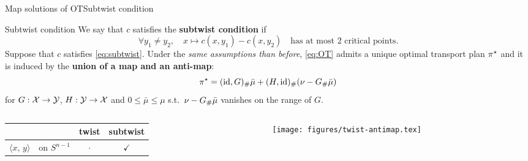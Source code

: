 \documentclass[9pt,xcolor={dvipsnames}]{beamer}
\begin{document}
\begin{frame}{Map solutions of OT}{Subtwist condition}
    \begin{block}{Subtwist condition }
        We say that $c$ satisfies the \textbf{subtwist condition} if
    \begin{equation}
        \tag{Subtwist}
        \forall y_1\neq y_2,\quad x\mapsto c(x,y_1)-c(x,y_2)\quad \text{has at most 2 critical points.}
        \label{eq:subtwist}
    \end{equation}
    Suppose that $c$ satisfies \cref{eq:subtwist}. Under the \emph{same assumptions than before}, \cref{eq:OT} admits a unique optimal transport plan $\pi^\star$ and it is induced by the \textbf{union of a map and an anti-map}:
    \begin{equation*}
        \pi^\star=(\operatorname{id} , G)_\# \bar\mu+(H, \operatorname{id})_\#(\nu-G_\# \bar\mu)
    \end{equation*}
    for $G:\mathcal{X}\to\mathcal{Y}$, $H: \mathcal{Y}\to\mathcal{X}$ and $0\leq\bar\mu \leq \mu$ s.t.~$\nu-G_\# \bar\mu$ vanishes on the range of $G$.
    \end{block}
    \begin{columns}
        \begin{column}{.7\textwidth}
                \begin{table}[h]
                    \raggedright
                    \begin{tabular}{ll|cc}
                                           &                &  twist        & subtwist  \\\hline
                    $\langle x,\,y\rangle$ & on $ S^{n-1}$ &  $\cdot$      & $\checkmark$
                    \end{tabular}
                \end{table}
        \end{column}
        \begin{column}{.3\textwidth}
            \begin{figure}
                \texttt{[image: figures/twist-antimap.tex]}
            \end{figure}
        \end{column}
    \end{columns}
\end{frame}
\end{document}
